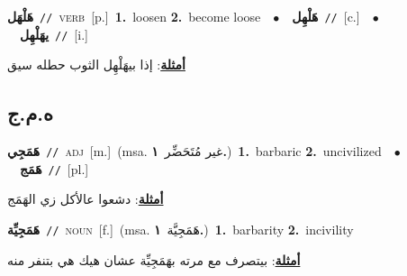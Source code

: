 \documentclass[10pt,a4paper,twoside]{article} %
\begin{document}
\begin{multicols}{2}
{\setlength\topsep{0pt}\textbf{\foreignlanguage{arabic}{هَلْهَل}}\ {\color{gray}\texttt{//}\color{black}}\ \textsc{verb}\ [p.]\ \textbf{1.}~loosen  \textbf{2.}~become loose\ \ $\bullet$\ \ \setlength\topsep{0pt}\textbf{\foreignlanguage{arabic}{هَلْهِل}}\ {\color{gray}\texttt{//}\color{black}}\ [c.]\ \ $\bullet$\ \ \setlength\topsep{0pt}\textbf{\foreignlanguage{arabic}{يهَلْهِل}}\ {\color{gray}\texttt{//}\color{black}}\ [i.]\  \begin{flushright}\color{gray}\foreignlanguage{arabic}{\textbf{\underline{\foreignlanguage{arabic}{أمثلة}}}: إذا بيهَلْهِل الثوب حطله سيق}\end{flushright}\color{black}} \vspace{2mm}

\vspace{-3mm}
\subsection*{\color{blue}\foreignlanguage{arabic}{ه.م.ج}\color{blue}{}} 

{\setlength\topsep{0pt}\textbf{\foreignlanguage{arabic}{هَمَجِي}}\ {\color{gray}\texttt{//}\color{black}}\ \textsc{adj}\ [m.]\ \color{gray}(msa. \foreignlanguage{arabic}{غير مُتَحَضِّر}~\foreignlanguage{arabic}{\textbf{١.}})\color{black}\ \textbf{1.}~barbaric  \textbf{2.}~uncivilized\ \ $\bullet$\ \ \setlength\topsep{0pt}\textbf{\foreignlanguage{arabic}{هَمَج}}\ {\color{gray}\texttt{//}\color{black}}\ [pl.]\  \begin{flushright}\color{gray}\foreignlanguage{arabic}{\textbf{\underline{\foreignlanguage{arabic}{أمثلة}}}: دشعوا عالأكل زي الهَمَج}\end{flushright}\color{black}} \vspace{2mm}

{\setlength\topsep{0pt}\textbf{\foreignlanguage{arabic}{هَمَجِيِّة}}\ {\color{gray}\texttt{//}\color{black}}\ \textsc{noun}\ [f.]\ \color{gray}(msa. \foreignlanguage{arabic}{هَمَجِيَّة}~\foreignlanguage{arabic}{\textbf{١.}})\color{black}\ \textbf{1.}~barbarity  \textbf{2.}~incivility\  \begin{flushright}\color{gray}\foreignlanguage{arabic}{\textbf{\underline{\foreignlanguage{arabic}{أمثلة}}}: بيتصرف مع مرته بهَمَجِيِّة عشان هيك هي بتنفر منه}\end{flushright}\color{black}} \vspace{2mm}


\end{multicols}
\end{document}
